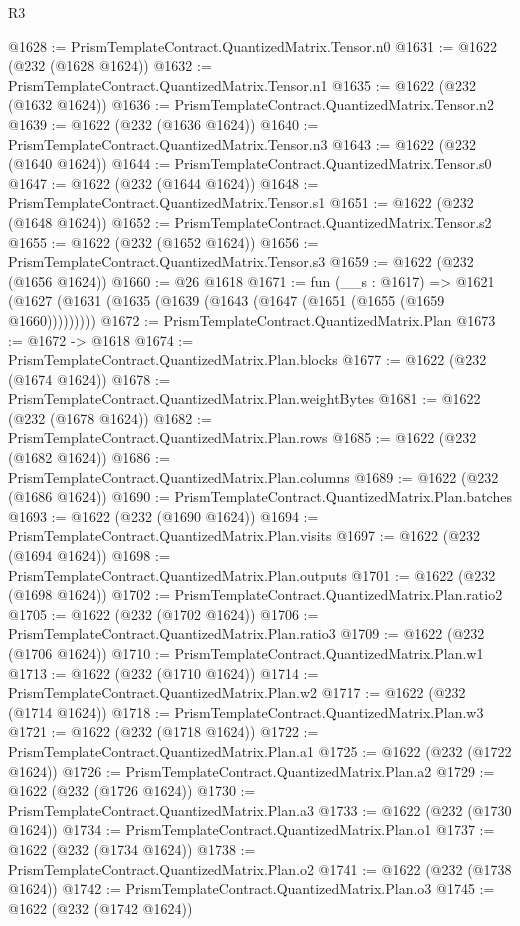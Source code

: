 \begin{lexlean}{R3}
\begin{coremodule}
@1628 := PrismTemplateContract.QuantizedMatrix.Tensor.n0
@1631 := @1622 (@232 (@1628 @1624))
@1632 := PrismTemplateContract.QuantizedMatrix.Tensor.n1
@1635 := @1622 (@232 (@1632 @1624))
@1636 := PrismTemplateContract.QuantizedMatrix.Tensor.n2
@1639 := @1622 (@232 (@1636 @1624))
@1640 := PrismTemplateContract.QuantizedMatrix.Tensor.n3
@1643 := @1622 (@232 (@1640 @1624))
@1644 := PrismTemplateContract.QuantizedMatrix.Tensor.s0
@1647 := @1622 (@232 (@1644 @1624))
@1648 := PrismTemplateContract.QuantizedMatrix.Tensor.s1
@1651 := @1622 (@232 (@1648 @1624))
@1652 := PrismTemplateContract.QuantizedMatrix.Tensor.s2
@1655 := @1622 (@232 (@1652 @1624))
@1656 := PrismTemplateContract.QuantizedMatrix.Tensor.s3
@1659 := @1622 (@232 (@1656 @1624))
@1660 := @26 @1618
@1671 := fun (__s : @1617) =>
  @1621 (@1627 (@1631 (@1635 (@1639 (@1643 (@1647 (@1651 (@1655 (@1659 @1660)))))))))
@1672 := PrismTemplateContract.QuantizedMatrix.Plan
@1673 := @1672 -> @1618
@1674 := PrismTemplateContract.QuantizedMatrix.Plan.blocks
@1677 := @1622 (@232 (@1674 @1624))
@1678 := PrismTemplateContract.QuantizedMatrix.Plan.weightBytes
@1681 := @1622 (@232 (@1678 @1624))
@1682 := PrismTemplateContract.QuantizedMatrix.Plan.rows
@1685 := @1622 (@232 (@1682 @1624))
@1686 := PrismTemplateContract.QuantizedMatrix.Plan.columns
@1689 := @1622 (@232 (@1686 @1624))
@1690 := PrismTemplateContract.QuantizedMatrix.Plan.batches
@1693 := @1622 (@232 (@1690 @1624))
@1694 := PrismTemplateContract.QuantizedMatrix.Plan.visits
@1697 := @1622 (@232 (@1694 @1624))
@1698 := PrismTemplateContract.QuantizedMatrix.Plan.outputs
@1701 := @1622 (@232 (@1698 @1624))
@1702 := PrismTemplateContract.QuantizedMatrix.Plan.ratio2
@1705 := @1622 (@232 (@1702 @1624))
@1706 := PrismTemplateContract.QuantizedMatrix.Plan.ratio3
@1709 := @1622 (@232 (@1706 @1624))
@1710 := PrismTemplateContract.QuantizedMatrix.Plan.w1
@1713 := @1622 (@232 (@1710 @1624))
@1714 := PrismTemplateContract.QuantizedMatrix.Plan.w2
@1717 := @1622 (@232 (@1714 @1624))
@1718 := PrismTemplateContract.QuantizedMatrix.Plan.w3
@1721 := @1622 (@232 (@1718 @1624))
@1722 := PrismTemplateContract.QuantizedMatrix.Plan.a1
@1725 := @1622 (@232 (@1722 @1624))
@1726 := PrismTemplateContract.QuantizedMatrix.Plan.a2
@1729 := @1622 (@232 (@1726 @1624))
@1730 := PrismTemplateContract.QuantizedMatrix.Plan.a3
@1733 := @1622 (@232 (@1730 @1624))
@1734 := PrismTemplateContract.QuantizedMatrix.Plan.o1
@1737 := @1622 (@232 (@1734 @1624))
@1738 := PrismTemplateContract.QuantizedMatrix.Plan.o2
@1741 := @1622 (@232 (@1738 @1624))
@1742 := PrismTemplateContract.QuantizedMatrix.Plan.o3
@1745 := @1622 (@232 (@1742 @1624))

\end{coremodule}
\end{lexlean}
